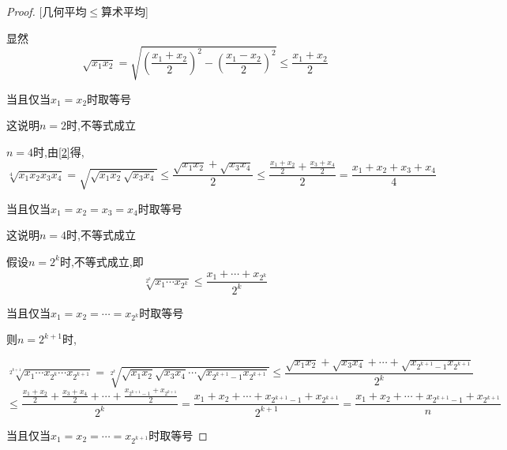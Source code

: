 \begin{proof}

    [几何平均$\le$算术平均]

    \vspace{4pt}

    显然
    \begin{equation}
        \sqrt{x_1x_2}=\sqrt{(\frac{x_1+x_2}{2})^2-(\frac{x_1-x_2}{2})^2}\le \frac{x_1+x_2}{2}   \label{2}
    \end{equation}

    当且仅当$x_1=x_2$时取等号

    这说明$n=2$时,不等式成立
    \vspace{6pt}

    $n=4$时,由\ref{2}得,
    \begin{equation}
        \sqrt[4]{x_1x_2x_3x_4}=\sqrt{\sqrt{x_1x_2}\sqrt{x_3x_4}}\le \frac{\sqrt{x_1x_2}+\sqrt{x_3x_4}}{2}\le \frac{\frac{x_1+x_2}{2}+\frac{x_3+x_4}{2}}{2}=\frac{x_1+x_2+x_3+x_4}{4}    \label{4递推}
    \end{equation}

    当且仅当$x_1=x_2=x_3=x_4$时取等号

    这说明$n=4$时,不等式成立
    \vspace{8pt}

    假设$n=2^k$时,不等式成立,即
    \begin{equation}
        \sqrt[2^k]{x_1\cdots x_{2^k}}\le \frac{x_1+\cdots+x_{2^k}}{2^k}
    \end{equation}

    当且仅当$x_1=x_2=\cdots = x_{2^k}$时取等号

    \vspace{8pt}

    则$n=2^{k+1}$时,

    \begin{equation*}
        \sqrt[2^{k+1}]{x_1\cdots x_{2^k}\cdots x_{2^{k+1}}}=\sqrt[2^k]{\sqrt{x_1 x_2} \sqrt{x_3 x_4} \cdots \sqrt{x_{2^{k+1}-1} x_{2^{k+1}}}}\le \frac{\sqrt{x_1 x_2}+\sqrt{x_3 x_4}+\cdots+\sqrt{x_{2^{k+1}-1} x_{2^{k+1}}}}{2^k}
    \end{equation*}
    \begin{equation}
        \le \frac{ \frac{x_1+x_2}{2} + \frac{x_3+x_4}{2} + \cdots + \frac{x_{2^{k+1}-1}+x_{2^{k+1}}}{2}}{2^k} = \frac{x_1+x_2+\cdots + x_{2^{k+1}-1}+x_{2^{k+1}}}{2^{k+1}}=\frac{x_1+x_2+\cdots + x_{2^{k+1}-1}+x_{2^{k+1}}}{n}
    \end{equation}

    当且仅当$x_1=x_2=\cdots = x_{2^{k+1}}$时取等号


\end{proof}
